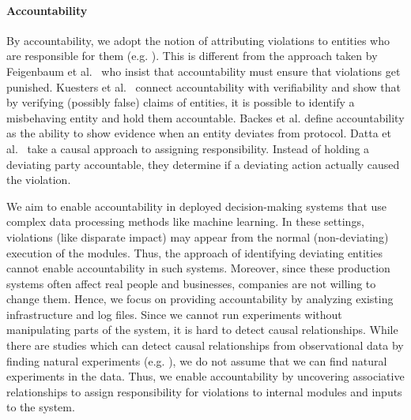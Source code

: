 \documentclass[10pt, onecolumn]{report}
\begin{document}
\paragraph{Accountability}
By accountability, we adopt the notion of attributing violations to entities 
who are responsible for them (e.g. \cite{kuesters10ccs, 
backes2006compositional, datta2015program}). 
This is different from the approach taken by Feigenbaum et al.~\cite{feigenbaum12tr}
who insist that accountability must ensure that violations get punished. 
Kuesters et al.~\cite{kuesters10ccs} connect accountability with verifiability and
show that by verifying (possibly false) claims of entities, it is possible to identify
a misbehaving entity and hold them accountable. %
Backes et al.\cite{backes2006compositional} define accountability as the ability to 
show evidence when an entity deviates from protocol. 
Datta et al.~\cite{datta2015program} take a causal approach to assigning responsibility.
Instead of holding a deviating party accountable, they determine if a deviating 
action actually caused the violation. 

We aim to enable accountability in deployed decision-making systems that 
use complex data processing methods like machine learning. 
In these settings, violations (like disparate impact) may appear from the normal 
(non-deviating) execution of the modules. Thus, the approach of identifying deviating 
entities cannot enable accountability in such systems. Moreover, since these production
systems often affect real people and businesses, companies are not willing to change 
them. Hence, we focus on providing accountability by analyzing 
existing infrastructure and log files. 
Since we cannot run experiments without manipulating parts of the system, it is 
hard to detect causal relationships. While there are studies which 
can detect causal relationships from observational data by finding natural 
experiments (e.g. \cite{sharmasplit}), we do not assume that we can find natural 
experiments in the data. Thus, we enable accountability by uncovering associative
relationships to assign responsibility for violations 
to internal modules and inputs to the system. 
\end{document}
